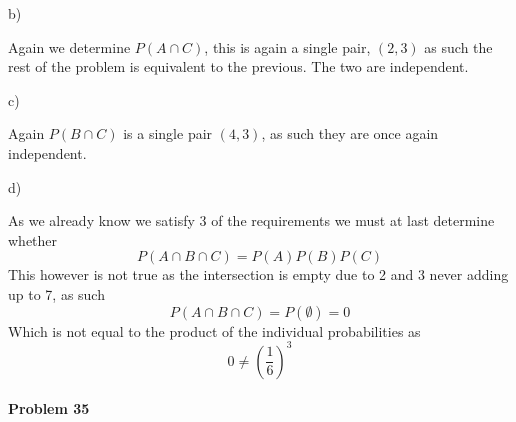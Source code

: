 b)

Again we determine $P(A\cap C)$, this is again a single pair, $(2,3)$ as such the rest of the problem is equivalent to the previous. The two are independent.

c)

Again $P(B\cap C)$ is a single pair $(4,3)$, as such they are once again independent.

d)

As we already know we satisfy 3 of the requirements we must at last determine whether
\[
    P(A\cap B\cap C)=P(A)P(B)P(C)
\]
This however is not true as the intersection is empty due to 2 and 3 never adding up to 7, as such
\[
    P(A\cap B\cap C)=P(\emptyset)=0
\]
Which is not equal to the product of the individual probabilities as
\[
    0\neq\left(\frac{1}{6}\right)^{3}
\]
\paragraph{Problem 35}
